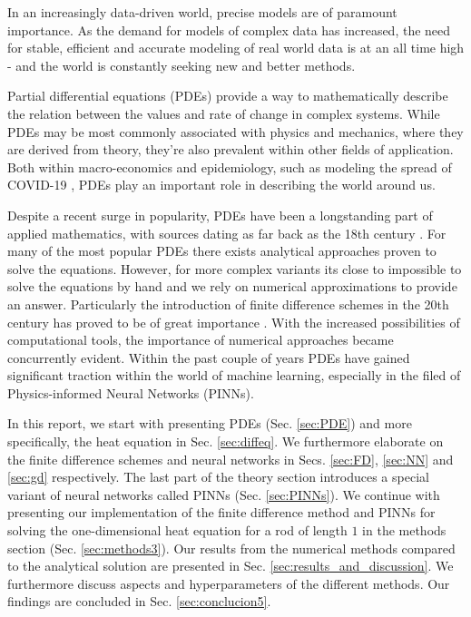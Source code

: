In an increasingly data-driven world, precise models are of paramount importance.
As the demand for models of complex data has increased, the need for stable, efficient and accurate modeling of real world data is at an all time high - and the world is constantly seeking new and better methods.

Partial differential equations (PDEs) provide a way to mathematically describe the relation between the values and rate of change in complex systems.
While PDEs may be most commonly associated with physics and mechanics, where they are derived from theory, they're also prevalent within other fields of application.
Both within macro-economics \cite{ecoPDE} and epidemiology, such as modeling the spread of COVID-19 \cite{covidus}, PDEs play an important role in describing the world around us. 

Despite a recent surge in popularity, PDEs have been a longstanding part of applied mathematics, with sources dating as far back as the 18th century \cite{Cajori}. For many of the most popular PDEs there exists analytical approaches proven to solve the equations. However, for more complex variants its close to impossible to solve the equations by hand and we rely on numerical approximations to provide an answer. Particularly the introduction of finite difference schemes in the 20th century has proved to be of great importance \cite{sloan2012}. With the increased possibilities of computational tools, the importance of numerical approaches became concurrently evident. Within the past couple of years PDEs have gained significant traction within the world of machine learning, especially in the filed of Physics-informed Neural Networks (PINNs).  

In this report, we start with presenting PDEs (Sec. \ref{sec:PDE}) and more specifically, the heat equation in Sec. \ref{sec:diffeq}.
We furthermore elaborate on the finite difference schemes and neural networks in Secs. \ref{sec:FD}, \ref{sec:NN} and \ref{sec:gd} respectively. 
The last part of the theory section introduces a special variant of neural networks called PINNs (Sec. \ref{sec:PINNs}).
We continue with presenting our implementation of the finite difference method and PINNs for solving the one-dimensional heat equation for a rod of length $1$ in the methods section (Sec. \ref{sec:methods3}).
Our results from the numerical methods compared to the analytical solution are presented in Sec. \ref{sec:results_and_discussion}.
We furthermore discuss aspects and hyperparameters of the different methods. 
Our findings are concluded in Sec. \ref{sec:conclucion5}.

